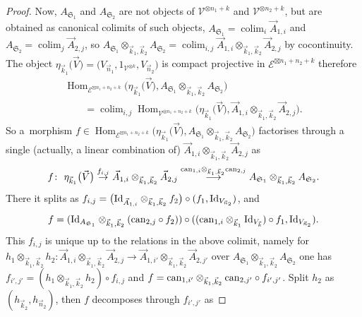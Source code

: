 \documentclass[pdftex]{sigma}%
\numberwithin{equation}{section}
\newcommand{\colim}{\operatorname{colim}}
\newcommand{\Hom}{\operatorname{Hom}}
\begin{document}
\begin{proof}
Now, $A_{\mathfrak{S}_1}$ and $A_{\mathfrak{S}_2}$ are not objects of $\mathcal{V}^{\otimes n_1+k}$ and $\mathcal{V}^{\otimes n_2+k}$, but are obtained as canonical colimits of such objects, $A_{\mathfrak{S}_1} = \colim_i \vec{A}_{1,i}$ and $A_{\mathfrak{S}_2} = \colim_j \vec{A}_{2,j}$, so $A_{\mathfrak{S}_1}\otimes_{\vec{k}_1,\vec{k}_2}A_{\mathfrak{S}_2} = \colim_{i,j} \vec{A}_{1,i} \otimes_{\vec{k}_1,\vec{k}_2} \vec{A}_{2,j}$ by cocontinuity.
The object $\eta_{\vec{k}_1}\big(\vec{V}\big)=\big(V_{\vec{n}_1},1_{\mathcal{V}^{\otimes k}},V_{\vec{n}_2}\big)$ is compact projective in $\mathcal{E}^{\boxtimes n_1+n_2+k}$ therefore
\begin{gather*}
\Hom_{\mathcal{E}^{\boxtimes n_1+n_2+k}}\big(\eta_{\vec{k}_1}\big(\vec{V}\big),A_{\mathfrak{S}_1}\otimes_{\vec{k}_1,\vec{k}_2}A_{\mathfrak{S}_2}\big) \\
\qquad{} = \colim_{i,j} \Hom_{\mathcal{V}^{\otimes n_1+n_2+k}}\big(\eta_{\vec{k}_1}\big(\vec{V}\big),\vec{A}_{1,i} \otimes_{\vec{k}_1,\vec{k}_2} \vec{A}_{2,j}\big).
\end{gather*}
So a~morphism $f \in \Hom_{\mathcal{E}^{\boxtimes n_1+n_2+k}}\big(\eta_{\vec{k}_1}\big(\vec{V}\big),A_{\mathfrak{S}_1}\otimes_{\vec{k}_1,\vec{k}_2}A_{\mathfrak{S}_2}\big)$ factorises through a single (actually, a linear combination of) $\vec{A}_{1,i} \otimes_{\vec{k}_1,\vec{k}_2} \vec{A}_{2,j}$ as
\[
f \colon\ \eta_{\vec{k}_1}\big(\vec{V}\big) \overset{f_{i,j}}\to \vec{A}_{1,i} \otimes_{\vec{k}_1,\vec{k}_2} \vec{A}_{2,j} \overset{{\rm can}_{1,i} \otimes_{\vec{k}_1,\vec{k}_2} {\rm can}_{2,j}}\longrightarrow A_{\mathfrak{S}_1}\otimes_{\vec{k}_1,\vec{k}_2}A_{\mathfrak{S}_2}.
\]
There it splits as $f_{i,j}= \big({\rm Id}_{\vec{A}_{1,i}} \otimes_{\vec{k}_1,\vec{k}_2} f_2\big) \circ (f_1 , {\rm Id}_{V_{\vec{n}_2}})$, and
\[
f = ({\rm Id}_{A_{\mathfrak{S}_1}} \otimes_{\vec{k}_1,\vec{k}_2} ({\rm can}_{2,j} \circ f_2)) \circ (({\rm can}_{1,i}\otimes_{\vec{k}_1} {\rm Id}_{V_{\vec{k}}}) \circ f_1 , {\rm Id}_{V_{\vec{n}_2}}).
\]
This $f_{i,j}$ is unique up to the relations in the above colimit, namely for $h_1 \otimes_{\vec{k}_1,\vec{k}_2} h_2 \colon \vec{A}_{1,i} \otimes_{\vec{k}_1,\vec{k}_2} \vec{A}_{2,j} \to \vec{A}_{1,i'} \otimes_{\vec{k}_1,\vec{k}_2} \vec{A}_{2,j'}$ over $A_{\mathfrak{S}_1}\otimes_{\vec{k}_1,\vec{k}_2}A_{\mathfrak{S}_2}$ one has $f_{i',j'} = (h_1 \otimes_{\vec{k}_1,\vec{k}_2} h_2) \circ f_{i,j}$ and $f ={\rm can}_{1,i'} \otimes_{\vec{k}_1,\vec{k}_2} {\rm can}_{2,j'} \circ f_{i',j'}$. Split $h_2$ as $(h_{\vec{k}_2}, h_{\vec{n}_2})$, then $f$ decomposes through $f_{i',j'}$ as

\end{proof}
\end{document}
